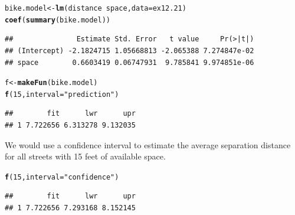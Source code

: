 \documentclass[twoside]{book}\usepackage[]{graphicx}\usepackage[]{xcolor}
\makeatletter
\newcommand{\hlnum}[1]{\textcolor[rgb]{0.686,0.059,0.569}{#1}}%
\newcommand{\hlstr}[1]{\textcolor[rgb]{0.192,0.494,0.8}{#1}}%
\newcommand{\hlopt}[1]{\textcolor[rgb]{0,0,0}{#1}}%
\newcommand{\hlstd}[1]{\textcolor[rgb]{0.345,0.345,0.345}{#1}}%
\newcommand{\hlkwb}[1]{\textcolor[rgb]{0.69,0.353,0.396}{#1}}%
\newcommand{\hlkwc}[1]{\textcolor[rgb]{0.333,0.667,0.333}{#1}}%
\newcommand{\hlkwd}[1]{\textcolor[rgb]{0.737,0.353,0.396}{\textbf{#1}}}%
\newenvironment{kframe}{%
 \def\at@end@of@kframe{}%
 \ifinner\ifhmode%
  \def\at@end@of@kframe{\end{minipage}}%
  \begin{minipage}{\columnwidth}%
 \fi\fi%
 \def\FrameCommand##1{\hskip\@totalleftmargin \hskip-\fboxsep
 \colorbox{shadecolor}{##1}\hskip-\fboxsep
     \hskip-\linewidth \hskip-\@totalleftmargin \hskip\columnwidth}%
 \MakeFramed {\advance\hsize-\width
   \@totalleftmargin\z@ \linewidth\hsize
   \@setminipage}}%
 {\par\unskip\endMakeFramed%
 \at@end@of@kframe}
\newenvironment{knitrout}{}{} %
\makeatother
\begin{document}
\begin{solution}
\begin{knitrout}
\color{fgcolor}\begin{kframe}
\begin{alltt}
\hlstd{bike.model} \hlkwb{<-} \hlkwd{lm}\hlstd{(distance} \hlopt{~} \hlstd{space,} \hlkwc{data} \hlstd{= ex12.21)}
\hlkwd{coef}\hlstd{(}\hlkwd{summary}\hlstd{(bike.model))}
\end{alltt}
\begin{verbatim}
##               Estimate Std. Error   t value     Pr(>|t|)
## (Intercept) -2.1824715 1.05668813 -2.065388 7.274847e-02
## space        0.6603419 0.06747931  9.785841 9.974851e-06
\end{verbatim}
\begin{alltt}
\hlstd{f} \hlkwb{<-} \hlkwd{makeFun}\hlstd{(bike.model)}
\hlkwd{f}\hlstd{(}\hlnum{15}\hlstd{,} \hlkwc{interval} \hlstd{=} \hlstr{"prediction"}\hlstd{)}
\end{alltt}
\begin{verbatim}
##        fit      lwr      upr
## 1 7.722656 6.313278 9.132035
\end{verbatim}
\end{kframe}
\end{knitrout}
We would use a confidence interval to estimate the average separation distance 
for all streets with 15 feet of available space.
\begin{knitrout}
\color{fgcolor}\begin{kframe}
\begin{alltt}
\hlkwd{f}\hlstd{(}\hlnum{15}\hlstd{,} \hlkwc{interval} \hlstd{=} \hlstr{"confidence"}\hlstd{)}
\end{alltt}
\begin{verbatim}
##        fit      lwr      upr
## 1 7.722656 7.293168 8.152145
\end{verbatim}
\end{kframe}
\end{knitrout}
\end{solution}
\end{document}
